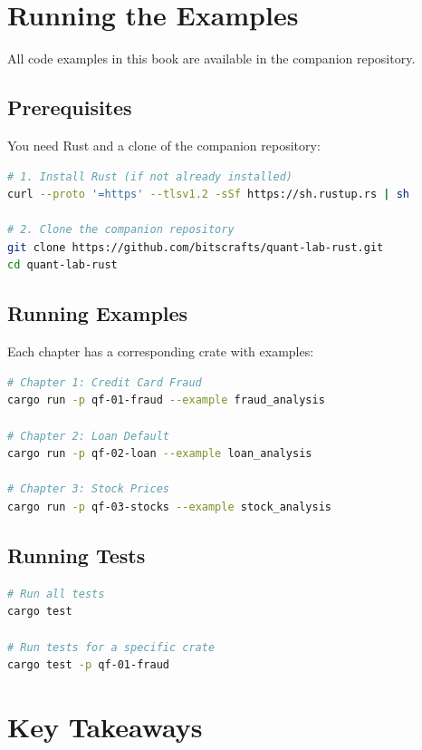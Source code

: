\section{Running the Examples}

All code examples in this book are available in the companion repository.

\subsection{Prerequisites}

You need Rust and a clone of the companion repository:

\begin{lstlisting}[language=bash]
# 1. Install Rust (if not already installed)
curl --proto '=https' --tlsv1.2 -sSf https://sh.rustup.rs | sh

# 2. Clone the companion repository
git clone https://github.com/bitscrafts/quant-lab-rust.git
cd quant-lab-rust
\end{lstlisting}

\subsection{Running Examples}

Each chapter has a corresponding crate with examples:

\begin{lstlisting}[language=bash]
# Chapter 1: Credit Card Fraud
cargo run -p qf-01-fraud --example fraud_analysis

# Chapter 2: Loan Default
cargo run -p qf-02-loan --example loan_analysis

# Chapter 3: Stock Prices
cargo run -p qf-03-stocks --example stock_analysis
\end{lstlisting}

\subsection{Running Tests}

\begin{lstlisting}[language=bash]
# Run all tests
cargo test

# Run tests for a specific crate
cargo test -p qf-01-fraud
\end{lstlisting}

\section{Key Takeaways}

